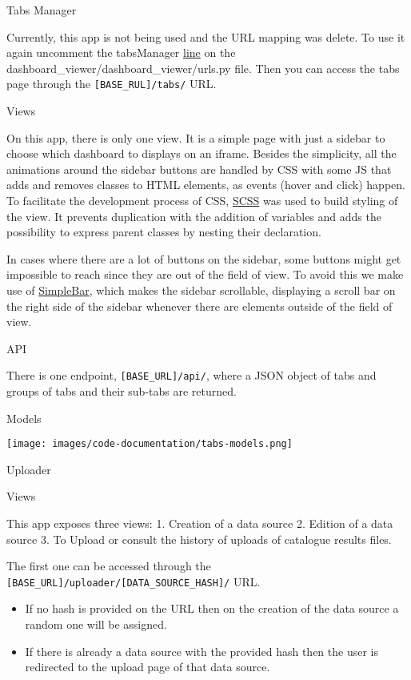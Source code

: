 \documentclass[
]{book}
\providecommand{\tightlist}{%
  \setlength{\itemsep}{0pt}\setlength{\parskip}{0pt}}
\begin{document}
Tabs Manager

Currently, this app is not being used and the URL mapping was delete.
To use it again uncomment the tabsManager \href{https://github.com/EHDEN/NetworkDashboards/blob/master/dashboard_viewer/dashboard_viewer/urls.py\#L29}{line} on the dashboard\_viewer/dashboard\_viewer/urls.py file.
Then you can access the tabs page through the \texttt{{[}BASE\_RUL{]}/tabs/} URL.

Views

On this app, there is only one view.
It is a simple page with just a sidebar to choose which dashboard to displays on an iframe.
Besides the simplicity, all the animations around the sidebar buttons are handled by CSS with some JS that adds and removes classes to HTML elements, as events (hover and click) happen.
To facilitate the development process of CSS, \href{https://sass-lang.com/}{SCSS} was used to build styling of the view.
It prevents duplication with the addition of variables and adds the possibility to express parent classes by nesting their declaration.

In cases where there are a lot of buttons on the sidebar, some buttons might get impossible to reach since they are out of the field of view.
To avoid this we make use of \href{https://github.com/Grsmto/simplebar}{SimpleBar}, which makes the sidebar scrollable, displaying a scroll bar on the right side of the sidebar whenever there are elements outside of the field of view.

API

There is one endpoint, \texttt{{[}BASE\_URL{]}/api/}, where a JSON object of tabs and groups of tabs and their sub-tabs are returned.

Models

\texttt{[image: images/code-documentation/tabs-models.png]}

Uploader

Views

This app exposes three views:
1. Creation of a data source
2. Edition of a data source
3. To Upload or consult the history of uploads of catalogue results files.

The first one can be accessed through the \texttt{{[}BASE\_URL{]}/uploader/{[}DATA\_SOURCE\_HASH{]}/} URL.

\begin{itemize}
\tightlist
\item
  If no hash is provided on the URL then on the creation of the data source a random one will be assigned.
\item
  If there is already a data source with the provided hash then the user is redirected to the upload page of that data source.
\end{itemize}
\end{document}

